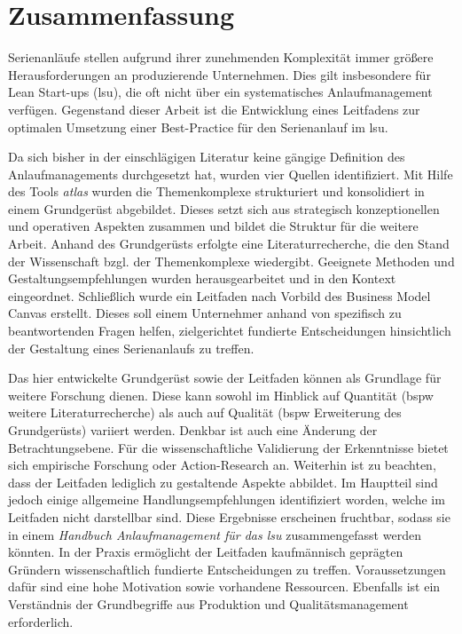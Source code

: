 \chapter*{Zusammenfassung}
Serienanläufe stellen aufgrund ihrer zunehmenden Komplexität immer größere Herausforderungen an produzierende Unternehmen. Dies gilt insbesondere für Lean Start-ups (\gls{lsu}), die oft nicht über ein systematisches Anlaufmanagement verfügen.
Gegenstand dieser Arbeit ist die Entwicklung eines Leitfadens zur optimalen Umsetzung einer Best-Practice für den Serienanlauf im \gls{lsu}.

Da sich bisher in der einschlägigen Literatur keine gängige Definition des Anlaufmanagements durchgesetzt hat, wurden vier Quellen identifiziert. 
% 
Mit Hilfe des Tools \textit{\gls{atlas}} wurden die Themenkomplexe strukturiert und konsolidiert in einem Grundgerüst abgebildet. Dieses setzt sich aus strategisch konzeptionellen und operativen Aspekten zusammen und bildet die Struktur für die weitere Arbeit. 
Anhand des Grundgerüsts erfolgte eine Literaturrecherche, die den Stand der Wissenschaft bzgl. der Themenkomplexe wiedergibt. Geeignete Methoden und Gestaltungsempfehlungen wurden herausgearbeitet und in den Kontext eingeordnet. 
Schließlich wurde ein Leitfaden nach Vorbild des Business Model Canvas erstellt. Dieses soll einem Unternehmer anhand von spezifisch zu beantwortenden Fragen helfen, zielgerichtet fundierte Entscheidungen hinsichtlich der Gestaltung eines Serienanlaufs zu treffen. 
% 

Das hier entwickelte Grundgerüst sowie der Leitfaden können als Grundlage für weitere Forschung dienen. Diese kann sowohl im Hinblick auf Quantität (\gls{bspw} weitere Literaturrecherche) als auch auf Qualität (\gls{bspw} Erweiterung des Grundgerüsts) variiert werden. Denkbar ist auch eine Änderung der Betrachtungsebene. Für die wissenschaftliche Validierung der Erkenntnisse bietet sich empirische Forschung oder Action-Research an. 
Weiterhin ist zu beachten, dass der Leitfaden lediglich zu gestaltende Aspekte abbildet. Im Hauptteil sind jedoch einige allgemeine Handlungsempfehlungen identifiziert worden, welche im Leitfaden nicht darstellbar sind. Diese Ergebnisse erscheinen fruchtbar, sodass sie in einem \textit{Handbuch Anlaufmanagement für das \gls{lsu}} zusammengefasst werden könnten.
% 
In der Praxis ermöglicht der Leitfaden kaufmännisch geprägten Gründern wissenschaftlich fundierte Entscheidungen zu treffen. Voraussetzungen dafür sind eine hohe Motivation sowie vorhandene Ressourcen. Ebenfalls ist ein Verständnis der Grundbegriffe aus Produktion und Qualitätsmanagement erforderlich. 


